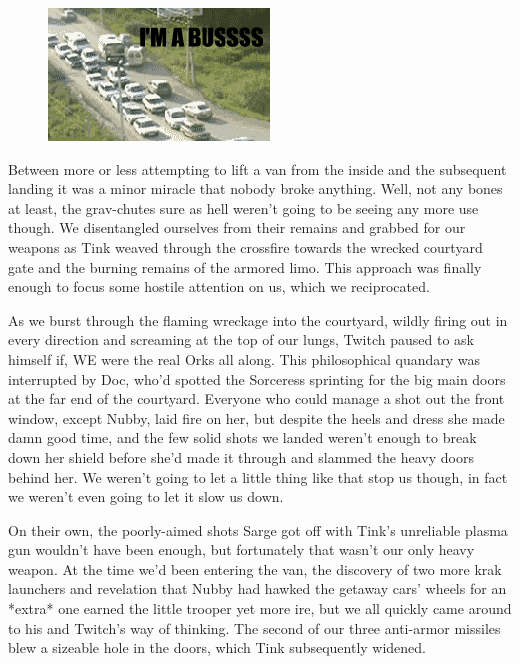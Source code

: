 \begin{figure}
	\begin{center}
		\includegraphics[width=\figwidth]{pics/18/57.png}
	\end{center}
\end{figure}
Between more or less attempting to lift a van from the inside and the subsequent landing it was a minor miracle that nobody broke anything. 
Well, not any bones at least, the grav-chutes sure as hell weren't going to be seeing any more use though. 
We disentangled ourselves from their remains and grabbed for our weapons as Tink weaved through the crossfire towards the wrecked courtyard gate and the burning remains of the armored limo. 
This approach was finally enough to focus some hostile attention on us, which we reciprocated.

As we burst through the flaming wreckage into the courtyard, wildly firing out in every direction and screaming at the top of our lungs, Twitch paused to ask himself if, WE were the real Orks all along. 
This philosophical quandary was interrupted by Doc, who'd spotted the Sorceress sprinting for the big main doors at the far end of the courtyard. 
Everyone who could manage a shot out the front window, except Nubby, laid fire on her, but despite the heels and dress she made damn good time, and the few solid shots we landed weren't enough to break down her shield before she'd made it through and slammed the heavy doors behind her. 
We weren't going to let a little thing like that stop us though, in fact we weren't even going to let it slow us down.

On their own, the poorly-aimed shots Sarge got off with Tink's unreliable plasma gun wouldn't have been enough, but fortunately that wasn't our only heavy weapon. 
At the time we'd been entering the van, the discovery of two more krak launchers and revelation that Nubby had hawked the getaway cars' wheels for an *extra* one earned the little trooper yet more ire, but we all quickly came around to his and Twitch's way of thinking. 
The second of our three anti-armor missiles blew a sizeable hole in the doors, which Tink subsequently widened. 


